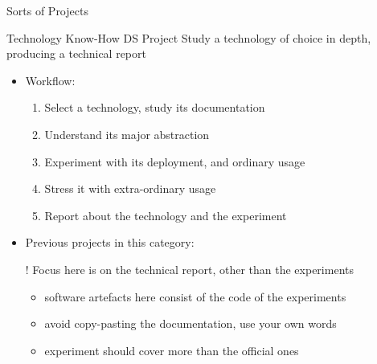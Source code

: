 \documentclass[presentation]{beamer}\mode<presentation>{\usetheme{AMSBolognaFC}}
\begin{document}
\begin{frame}[c, allowframebreaks]{Sorts of Projects}
    \begin{block}{Technology Know-How DS Project}
        Study a technology of choice in depth, producing a technical report
        \begin{itemize}
            \item Workflow:
            \begin{enumerate}
                \item Select a technology, study its documentation
                \item Understand its major abstraction
                \item Experiment with its deployment, and ordinary usage
                \item Stress it with extra-ordinary usage
                \item Report about the technology and the experiment
            \end{enumerate}
            \item Previous projects in this category: \cite{Sd2021ProjectEtcd,Sd2021ProjectCEPH,Sd2021ProjectKubernetes}
            \item[!] Focus here is on the technical report, other than the experiments
            \begin{itemize}
                \item software artefacts here consist of the code of the experiments
                \item avoid copy-pasting the documentation, use your own words
                \item experiment should cover more than the official ones
            \end{itemize}
        \end{itemize}
    \end{block}
\end{frame}

\section*{}
\frame{\titlepage}

\section*{\bibname}
\end{document}
